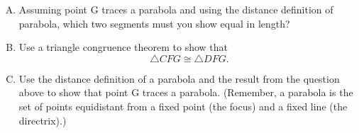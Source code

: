 \documentclass[11pt]{article}
\begin{document}
\vspace{0.2 in}


\begin{enumerate}[(A)]
\item Assuming point G traces a parabola and using the distance definition of parabola, which two segments must you show equal in length?

\item Use a triangle congruence theorem to show that $$\triangle {CFG} \cong \triangle {DFG}.$$

\item Use the distance definition of a parabola and the result from the question above to show that point G traces a parabola. (Remember, a parabola is the set of points equidistant from a fixed point (the focus) and a fixed line (the directrix).)

\end{enumerate}
\end{document}
